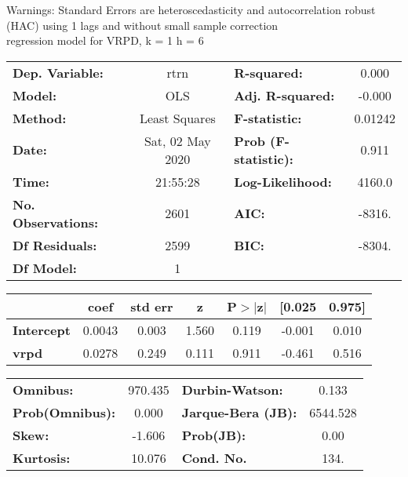 Warnings: \newline
 [1] Standard Errors are heteroscedasticity and autocorrelation robust (HAC) using 1 lags and without small sample correction\\ 

regression model for VRPD, k = 1 h = 6\begin{center}
\begin{tabular}{lclc}
\toprule
\textbf{Dep. Variable:}    &       rtrn       & \textbf{  R-squared:         } &     0.000   \\
\textbf{Model:}            &       OLS        & \textbf{  Adj. R-squared:    } &    -0.000   \\
\textbf{Method:}           &  Least Squares   & \textbf{  F-statistic:       } &   0.01242   \\
\textbf{Date:}             & Sat, 02 May 2020 & \textbf{  Prob (F-statistic):} &    0.911    \\
\textbf{Time:}             &     21:55:28     & \textbf{  Log-Likelihood:    } &    4160.0   \\
\textbf{No. Observations:} &        2601      & \textbf{  AIC:               } &    -8316.   \\
\textbf{Df Residuals:}     &        2599      & \textbf{  BIC:               } &    -8304.   \\
\textbf{Df Model:}         &           1      & \textbf{                     } &             \\
\bottomrule
\end{tabular}
\begin{tabular}{lcccccc}
                   & \textbf{coef} & \textbf{std err} & \textbf{z} & \textbf{P$> |$z$|$} & \textbf{[0.025} & \textbf{0.975]}  \\
\midrule
\textbf{Intercept} &       0.0043  &        0.003     &     1.560  &         0.119        &       -0.001    &        0.010     \\
\textbf{vrpd}      &       0.0278  &        0.249     &     0.111  &         0.911        &       -0.461    &        0.516     \\
\bottomrule
\end{tabular}
\begin{tabular}{lclc}
\textbf{Omnibus:}       & 970.435 & \textbf{  Durbin-Watson:     } &    0.133  \\
\textbf{Prob(Omnibus):} &   0.000 & \textbf{  Jarque-Bera (JB):  } & 6544.528  \\
\textbf{Skew:}          &  -1.606 & \textbf{  Prob(JB):          } &     0.00  \\
\textbf{Kurtosis:}      &  10.076 & \textbf{  Cond. No.          } &     134.  \\
\bottomrule
\end{tabular}
\end{center}

